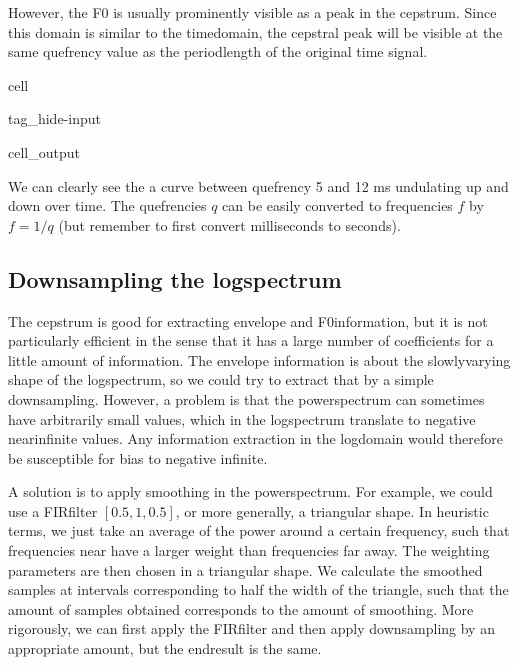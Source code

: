 \documentclass[letterpaper,10pt,english]{jupyterBook}
\begin{document}
\sphinxAtStartPar
However, the F0 is usually prominently visible as a peak in the cepstrum. Since this domain is similar to the time\sphinxhyphen{}domain, the cepstral peak will be visible at the same quefrency value as the period\sphinxhyphen{}length of the original time signal.

\begin{sphinxuseclass}{cell}
\begin{sphinxuseclass}{tag_hide-input}\begin{sphinxVerbatimOutput}

\begin{sphinxuseclass}{cell_output}
\noindent{}

\noindent{}

\end{sphinxuseclass}\end{sphinxVerbatimOutput}

\end{sphinxuseclass}
\end{sphinxuseclass}
\sphinxAtStartPar
We can clearly see the a curve between quefrency 5 and 12 ms undulating up and down over time.
The quefrencies \(q\) can be easily converted to frequencies \(f\) by \(f=1/q\) (but remember to first convert milliseconds to seconds).


\subsection{Down\sphinxhyphen{}sampling the log\sphinxhyphen{}spectrum}
\label{\detokenize{Representations/Melcepstrum:down-sampling-the-log-spectrum}}
\sphinxAtStartPar
The cepstrum is good for extracting envelope and F0\sphinxhyphen{}information, but it is not particularly efficient in the sense that it has a large number of coefficients for a little amount of information. The envelope information is about the slowly\sphinxhyphen{}varying shape of the log\sphinxhyphen{}spectrum, so we could try to extract that by a simple downsampling. However, a problem is that the power\sphinxhyphen{}spectrum can sometimes have arbitrarily small values, which in the log\sphinxhyphen{}spectrum translate to negative near\sphinxhyphen{}infinite values. Any information extraction in the log\sphinxhyphen{}domain would therefore be susceptible for bias to negative infinite.

\sphinxAtStartPar
A solution is to apply smoothing in the power\sphinxhyphen{}spectrum. For example, we could use a FIR\sphinxhyphen{}filter \([0.5,1,0.5]\), or more generally, a triangular shape. In heuristic terms, we just take an average of the power around a certain frequency, such that frequencies near have a larger weight than frequencies far away. The weighting parameters are then chosen in a triangular shape. We calculate the smoothed samples at intervals corresponding to half the width of the triangle, such that the amount of samples obtained corresponds to the amount of smoothing. More rigorously, we can first apply the FIR\sphinxhyphen{}filter and then apply down\sphinxhyphen{}sampling by an appropriate amount, but the end\sphinxhyphen{}result is the same.
\end{document}
